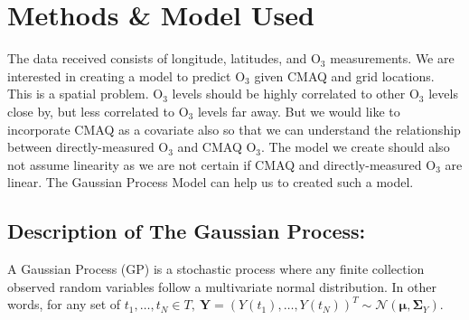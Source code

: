 \documentclass{article}                                                   %
\begin{document}
\section{Methods \& Model Used}
  The data received consists of longitude, latitudes, and O$_3$ measurements.
  We are interested in creating a model to predict O$_3$ given CMAQ and grid 
  locations. This is a spatial problem. O$_3$ levels should be highly correlated 
  to other O$_3$ levels close by, but less correlated to O$_3$ levels far away. 
  But we would like to incorporate CMAQ as a covariate also so that we can
  understand the relationship between directly-measured O$_3$ and CMAQ O$_3$.
  The model we create should also not assume linearity as we are not certain if
  CMAQ and directly-measured O$_3$ are linear. The Gaussian Process Model can
  help us to created such a model. 

  \subsection{Description of The Gaussian Process:}
  A Gaussian Process (GP) is a stochastic process where any finite collection
  observed random variables follow a multivariate normal distribution.
  In other words, for any set of $t_1,\dots,t_N \in T,~\bm{Y} =
  (Y(t_1),\dots,Y(t_N))^T \sim \mathcal{N}(\bm\mu,\bm\Sigma_Y)$.

\end{document}
